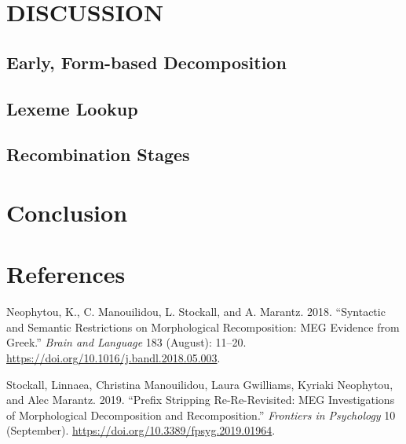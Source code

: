 \documentclass[
]{article}
\newlength{\cslhangindent}
\newenvironment{CSLReferences}[2] %
 {\begin{list}{}{%
  \setlength{\itemindent}{0pt}
  \setlength{\leftmargin}{0pt}
  \setlength{\parsep}{0pt}
  \ifodd #1
   \setlength{\leftmargin}{\cslhangindent}
   \setlength{\itemindent}{-1\cslhangindent}
  \fi
  \setlength{\itemsep}{#2\baselineskip}}}
 {\end{list}}
\begin{document}
\section{DISCUSSION}\label{discussion}

\subsection{Early, Form-based
Decomposition}\label{early-form-based-decomposition}

\subsection{Lexeme Lookup}\label{lexeme-lookup}

\subsection{Recombination Stages}\label{recombination-stages}

\section{Conclusion}\label{conclusion}

\section*{References}\label{references}

\label{refs}
\begin{CSLReferences}{1}{0}
Neophytou, K., C. Manouilidou, L. Stockall, and A. Marantz. 2018.
{``Syntactic and Semantic Restrictions on Morphological Recomposition:
MEG Evidence from Greek.''} \emph{Brain and Language} 183 (August):
11--20. \url{https://doi.org/10.1016/j.bandl.2018.05.003}.

Stockall, Linnaea, Christina Manouilidou, Laura Gwilliams, Kyriaki
Neophytou, and Alec Marantz. 2019. {``Prefix Stripping Re-Re-Revisited:
MEG Investigations of Morphological Decomposition and Recomposition.''}
\emph{Frontiers in Psychology} 10 (September).
\url{https://doi.org/10.3389/fpsyg.2019.01964}.

\end{CSLReferences}
\end{document}
